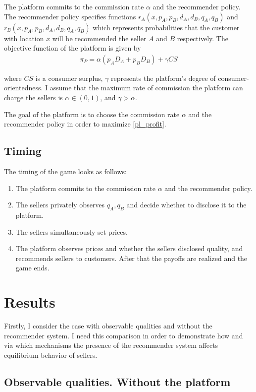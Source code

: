 \documentclass[a4paper]{article}
\begin{document}
	The platform commits to the commission rate $\alpha$ and the recommender policy. The recommender policy specifies functions $r_A(x, p_A, p_B, d_A, d_B, q_A, q_B)$ and $r_B(x, p_A, p_B, d_A, d_B, q_A, q_B)$ which represents probabilities that the customer with location $x$ will be recommended the seller $A$ and $B$ respectively. The objective function of the platform is given by \begin{align}\label{pl_profit}
	\pi_P = \alpha(p_A D_A + p_B D_B) + \gamma CS
	\end{align}
	
	where $CS$ is a consumer surplus, $\gamma$ represents the platform's degree of consumer-orientedness. I assume that the maximum rate of commission the platform can charge the sellers is $\bar{\alpha} \in (0, 1)$, and $\gamma > \bar{\alpha}$.
	
	
	The goal of the platform is to choose the commission rate $\alpha$ and the recommender policy in order to maximize \eqref{pl_profit}.
	
	\subsection{Timing}
	The timing of the game looks as follows:
	\begin{enumerate}
		\item The platform commits to the commission rate $\alpha$ and the recommender policy.
		\item The sellers privately observes $q_A, q_B$ and decide whether to disclose it to the platform.
		\item The sellers simultaneously set prices.
		\item The platform observes prices and whether the sellers disclosed quality, and recommends sellers to customers. After that the payoffs are realized and the game ends.
	\end{enumerate}

	\section{Results}
	Firstly, I consider the case with observable qualities and without the recommender system. I need this comparison in order to demonstrate how and via which mechanisms the presence of the recommender system affects equilibrium behavior of sellers.
	
	
	\subsection{Observable qualities. Without the platform}
\end{document}
